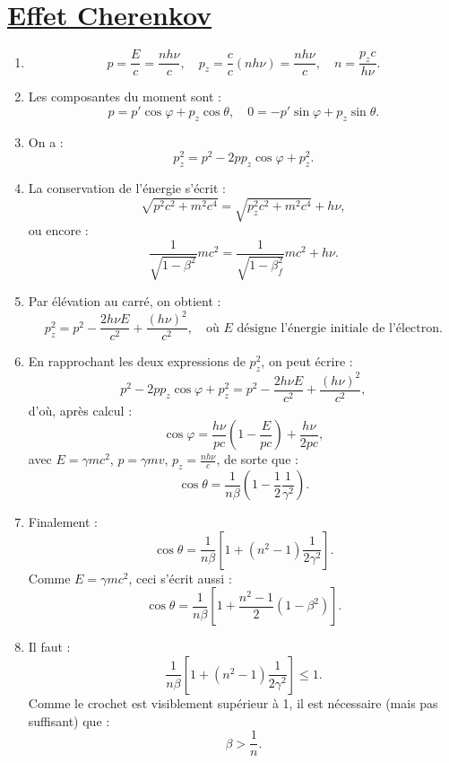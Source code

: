 \documentclass[a4paper,10pt]{report}
\begin{document}
	
	\newpage \section{\hyperref[subsec:Cherenkov]{Effet Cherenkov}}\label{subsec:correctionCherenkov}
	\begin{enumerate}
		\item 
		\[
		p = \frac{E}{c} = \frac{nh\nu}{c}, \quad p_z = \frac{c}{c} (nh\nu) = \frac{nh\nu}{c}, \quad n = \frac{p_z c}{h\nu}.
		\]
		
		\item Les composantes du moment sont :
		\[
		p = p' \cos\varphi + p_z \cos\theta, \quad 0 = -p' \sin\varphi + p_z \sin\theta.
		\]
		
		\item On a :
		\[
		p_z^2 = p^2 - 2pp_z \cos\varphi + p_z^2.
		\]
		
		\item La conservation de l’énergie s’écrit :
		\[
		\sqrt{p^2c^2 + m^2c^4} = \sqrt{p_z^2c^2 + m^2c^4} + h\nu,
		\]
		ou encore :
		\[
		\frac{1}{\sqrt{1 - \beta^2}}mc^2 = \frac{1}{\sqrt{1 - \beta_f^2}}mc^2 + h\nu.
		\]
		
		\item Par élévation au carré, on obtient :
		\[
		p_z^2 = p^2 - \frac{2h\nu E}{c^2} + \frac{(h\nu)^2}{c^2}, \quad \text{où } E \text{ désigne l’énergie initiale de l’électron.}
		\]
		
		\item En rapprochant les deux expressions de $p_z^2$, on peut écrire :
		\[
		p^2 - 2pp_z \cos\varphi + p_z^2 = p^2 - \frac{2h\nu E}{c^2} + \frac{(h\nu)^2}{c^2},
		\]
		d’où, après calcul :
		\[
		\cos\varphi = \frac{h\nu}{pc} \left(1 - \frac{E}{pc} \right) + \frac{h\nu}{2pc},
		\]
		avec $E = \gamma mc^2$, $p = \gamma mv$, $p_z = \frac{nh\nu}{c}$, de sorte que :
		\[
		\cos\theta = \frac{1}{n\beta} \left(1 - \frac{1}{2} \frac{1}{\gamma^2} \right).
		\]
		
		\item Finalement :
		\[
		\cos\theta = \frac{1}{n\beta} \left[1 + (n^2 - 1)\frac{1}{2\gamma^2} \right].
		\]
		Comme $E = \gamma mc^2$, ceci s’écrit aussi :
		\[
		\cos\theta = \frac{1}{n\beta} \left[1 + \frac{n^2 - 1}{2} \left(1 - \beta^2 \right) \right].
		\]
		
		\item Il faut :
		\[
		\frac{1}{n\beta} \left[1 + (n^2 - 1) \frac{1}{2\gamma^2} \right] \leq 1.
		\]
		Comme le crochet est visiblement supérieur à 1, il est nécessaire (mais pas suffisant) que :
		\[
		\beta > \frac{1}{n}.
		\]
		

\end{enumerate}
\end{document}
